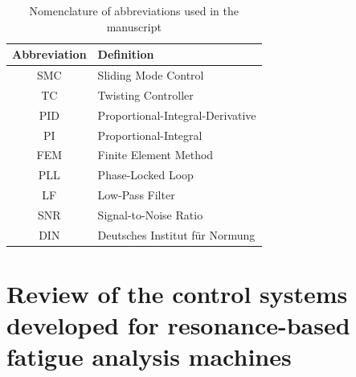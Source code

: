 \documentclass[lettersize,journal]{IEEEtran}
\begin{document}
\begin{table}[h]
    \centering
    \begin{tabular}{|c|l|}
        \hline
        \textbf{Abbreviation} & \textbf{Definition} \\ \hline
        SMC & Sliding Mode Control \\ \hline
        TC & Twisting Controller \\ \hline
        PID & Proportional-Integral-Derivative \\ \hline
        PI & Proportional-Integral \\ \hline
        FEM & Finite Element Method \\ \hline
        PLL & Phase-Locked Loop \\ \hline
        LF & Low-Pass Filter \\ \hline
        SNR & Signal-to-Noise Ratio \\ \hline
        DIN & Deutsches Institut für Normung \\ \hline
    \end{tabular}
    \vspace{0.1cm}
    \caption{Nomenclature of abbreviations used in the manuscript}
    \label{T_nomenclature}
\end{table}


\section{Review of the control systems developed for resonance-based fatigue analysis machines} \label{S_control_system}
\end{document}
